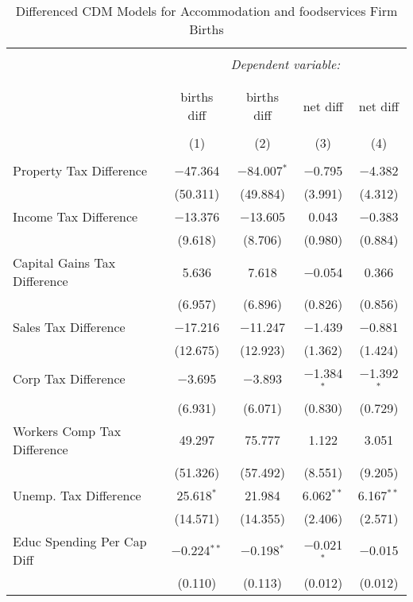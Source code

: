 
\begin{table}[!htbp] \centering 
  \caption{Differenced CDM Models for  Accommodation and foodservices Firm Births} 
  \label{} 
\begin{tabular}{@{\extracolsep{5pt}}lcccc} 
\\[-1.8ex]\hline 
\hline \\[-1.8ex] 
 & \multicolumn{4}{c}{\textit{Dependent variable:}} \\ 
\cline{2-5} 
\\[-1.8ex] & \multicolumn{4}{c}{ } \\ 
 & births diff & births diff & net diff & net diff \\ 
\\[-1.8ex] & (1) & (2) & (3) & (4)\\ 
\hline \\[-1.8ex] 
 Property Tax Difference & $-$47.364 & $-$84.007$^{*}$ & $-$0.795 & $-$4.382 \\ 
  & (50.311) & (49.884) & (3.991) & (4.312) \\ 
  Income Tax Difference & $-$13.376 & $-$13.605 & 0.043 & $-$0.383 \\ 
  & (9.618) & (8.706) & (0.980) & (0.884) \\ 
  Capital Gains Tax Difference & 5.636 & 7.618 & $-$0.054 & 0.366 \\ 
  & (6.957) & (6.896) & (0.826) & (0.856) \\ 
  Sales Tax Difference & $-$17.216 & $-$11.247 & $-$1.439 & $-$0.881 \\ 
  & (12.675) & (12.923) & (1.362) & (1.424) \\ 
  Corp Tax Difference & $-$3.695 & $-$3.893 & $-$1.384$^{*}$ & $-$1.392$^{*}$ \\ 
  & (6.931) & (6.071) & (0.830) & (0.729) \\ 
  Workers Comp Tax Difference & 49.297 & 75.777 & 1.122 & 3.051 \\ 
  & (51.326) & (57.492) & (8.551) & (9.205) \\ 
  Unemp. Tax Difference & 25.618$^{*}$ & 21.984 & 6.062$^{**}$ & 6.167$^{**}$ \\ 
  & (14.571) & (14.355) & (2.406) & (2.571) \\ 
  Educ Spending Per Cap Diff & $-$0.224$^{**}$ & $-$0.198$^{*}$ & $-$0.021$^{*}$ & $-$0.015 \\ 
  & (0.110) & (0.113) & (0.012) & (0.012) \\ 

\end{tabular}
\end{table}
